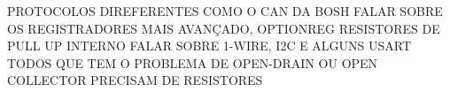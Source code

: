 
PROTOCOLOS DIREFERENTES COMO O CAN DA BOSH
FALAR SOBRE OS REGISTRADORES MAIS  AVANÇADO, OPTIONREG
RESISTORES DE PULL UP INTERNO
FALAR SOBRE 1-WIRE, I2C E ALGUNS USART TODOS QUE TEM O PROBLEMA DE OPEN-DRAIN OU OPEN COLLECTOR PRECISAM DE RESISTORES